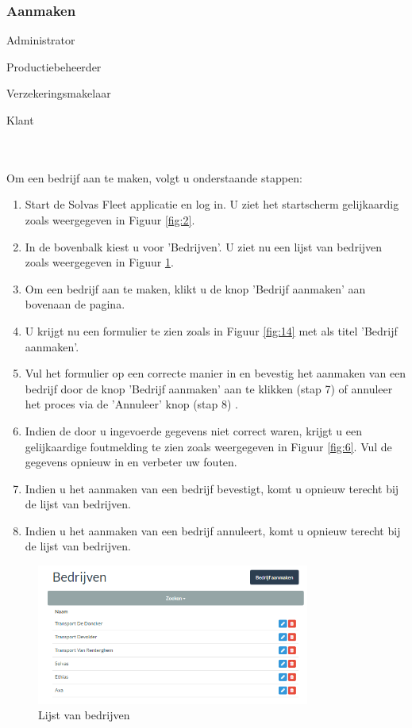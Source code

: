 \documentclass[11pt,openany]{article}
\newcommand{\cmark}{\ding{51}}%
\newcommand{\xmark}{\ding{55}}%
\newcommand{\done}{\rlap{$\square$}{\raisebox{2pt}{\large\hspace{1pt}\cmark}}%
	\hspace{-2.5pt}}
\newcommand{\wontfix}{\rlap{$\square$}{\large\hspace{1pt}\xmark}}
\begin{document}
\subsubsection{Aanmaken}
\label{company_new}
\begin{todolist}
	\item[\done] Administrator
	\item[\done] Productiebeheerder
	\item[\done] Verzekeringsmakelaar
	\item[\wontfix] Klant 
\end{todolist}
\\
\\
Om een bedrijf aan te maken, volgt u onderstaande stappen:
\begin{enumerate}
	\item Start de Solvas Fleet applicatie en log in. U ziet het startscherm gelijkaardig zoals weergegeven in Figuur \ref{fig:2}.
	\item In de bovenbalk kiest u voor 'Bedrijven'. U ziet nu een lijst van bedrijven zoals weergegeven in Figuur \ref{fig:13}.
	\item Om een bedrijf aan te maken, klikt u de knop 'Bedrijf aanmaken' aan bovenaan de pagina. 
	\item U krijgt nu een formulier te zien zoals in Figuur \ref{fig:14} met als titel 'Bedrijf aanmaken'.
	\item Vul het formulier op een correcte manier in en bevestig het aanmaken van een bedrijf door de knop 'Bedrijf aanmaken' aan te klikken (stap 7) of annuleer het proces via de 'Annuleer' knop (stap 8) .
	\item Indien de door u ingevoerde gegevens niet correct waren, krijgt u een gelijkaardige foutmelding te zien zoals weergegeven in Figuur \ref{fig:6}. Vul de gegevens opnieuw in en verbeter uw fouten.
	\item Indien u het aanmaken van een bedrijf bevestigt, komt u opnieuw terecht bij de lijst van bedrijven. 
	\item Indien u het aanmaken van een bedrijf annuleert, komt u opnieuw terecht bij de lijst van bedrijven.
	
\end{enumerate}
\begin{figure}
	\centering
	\includegraphics[width=0.8\textwidth]{img/fig13.png}
	\caption{Lijst van bedrijven} 
	\label{fig:13} 
\end{figure}
\end{document}
